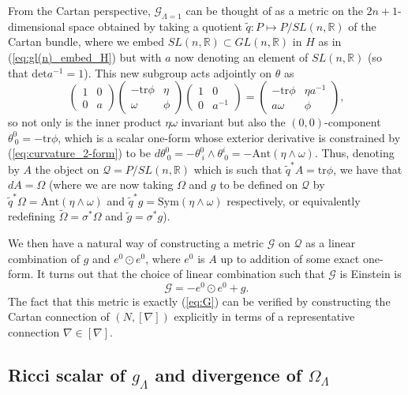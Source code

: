 From the Cartan perspective, $\mathcal{G}_{\Lambda=1}$ can be thought
of as a metric on the $2n+1$-dimensional space obtained by taking
a quotient $\tilde{q}:P\mapsto P/SL(n,\mathbb{R})$ of the Cartan
bundle, where we embed $SL(n,\mathbb{R})\subset GL(n,\mathbb{R})$
in $H$ as in (\ref{eq:gl(n)_embed_H}) but with $a$ now denoting
an element of $SL(n,\mathbb{R})$ (so that $\mathrm{det}a^{-1}=1$).
This new subgroup acts adjointly on $\theta$ as
\[
\begin{pmatrix}1 & 0\\
0 & a
\end{pmatrix}\begin{pmatrix}-\mathrm{tr}\phi & \eta\\
\omega & \phi
\end{pmatrix}\begin{pmatrix}1 & 0\\
0 & a^{-1}
\end{pmatrix}=\begin{pmatrix}-\mathrm{tr}\phi & \eta a^{-1}\\
a\omega & \phi
\end{pmatrix},
\]
so not only is the inner product $\eta\omega$ invariant but also
the $(0,0)$-component $\theta_{\ 0}^{0}=\mathrm{-tr}\phi$, which
is a scalar one-form whose exterior derivative is constrained by (\ref{eq:curvature_2-form})
to be $ d\theta_{\ 0}^{0}=-\theta_{\ i}^{0}\wedge\theta_{\ 0}^{i}=-\mathrm{Ant}(\eta\wedge\omega)$.
Thus, denoting by $A$ the object on $\mathcal{Q}=P/SL(n,\mathbb{R})$
which is such that $\tilde{q}^{*}A=\mathrm{tr}\phi$, we have that
$ dA=\Omega$ (where we are now taking $\Omega$ and $g$
to be defined on $\mathcal{Q}$ by $\tilde{q}^{*}\Omega=\mathrm{Ant}(\eta\wedge\omega)$
and $\tilde{q}^{*}g=\mathrm{Sym}(\eta\wedge\omega)$ respectively,
or equivalently redefining $\tilde{\Omega}=\sigma^{*}\Omega$ and
$\tilde{g}=\sigma^{*}g$).

We then have a natural way of constructing a metric $\mathcal{G}$
on $\mathcal{Q}$ as a linear combination of $g$ and $e^{0}\odot e^{0}$,
where $e^{0}$ is $A$ up to addition of some exact one-form. It turns
out that the choice of linear combination such that $\mathcal{G}$
is Einstein is 
\[
\mathcal{G}=-e^{0}\odot e^{0}+g.
\]
The fact that this metric is exactly (\ref{eq:G}) can be verified
by constructing the Cartan connection of $(N,[\nabla])$ explicitly
in terms of a representative connection $\nabla\in[\nabla]$.

\subsection{Ricci scalar of $g_\Lambda$ and divergence of $\Omega_\Lambda$}

